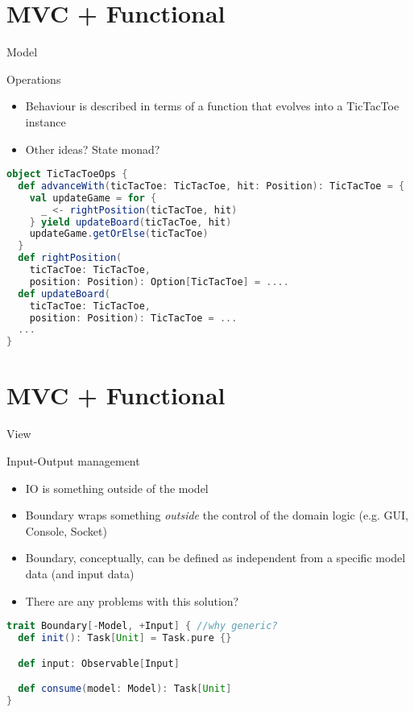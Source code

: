 \documentclass[presentation]{beamer}
\begin{document}
\section{MVC + Functional}
\begin{frame}[fragile]{Model}
\begin{block}{Operations}
\begin{itemize}
\item Behaviour is described in terms of a function that evolves into a TicTacToe instance
\item Other ideas? State monad?
\end{itemize}
\end{block}
\begin{lstlisting}[language=scala]
object TicTacToeOps {
  def advanceWith(ticTacToe: TicTacToe, hit: Position): TicTacToe = {
    val updateGame = for {
      _ <- rightPosition(ticTacToe, hit)
    } yield updateBoard(ticTacToe, hit)
    updateGame.getOrElse(ticTacToe)
  }
  def rightPosition(
    ticTacToe: TicTacToe, 
    position: Position): Option[TicTacToe] = ....
  def updateBoard(
    ticTacToe: TicTacToe, 
    position: Position): TicTacToe = ...
  ...
}
\end{lstlisting}
\end{frame}
\section{MVC + Functional}
\begin{frame}[fragile]{View}
\begin{block}{Input-Output management}
\begin{itemize}
\item IO is something outside of the model
\item Boundary wraps something \emph{outside} the control of the domain logic (e.g. GUI, Console, Socket) 
\item Boundary, conceptually, can be defined as independent from a specific model data (and input data)
\item There are any problems with this solution?
\end{itemize}
\end{block}
\begin{lstlisting}[language=scala]
trait Boundary[-Model, +Input] { //why generic?
  def init(): Task[Unit] = Task.pure {}

  def input: Observable[Input]

  def consume(model: Model): Task[Unit]
}
\end{lstlisting}
\end{frame}
\end{document}
